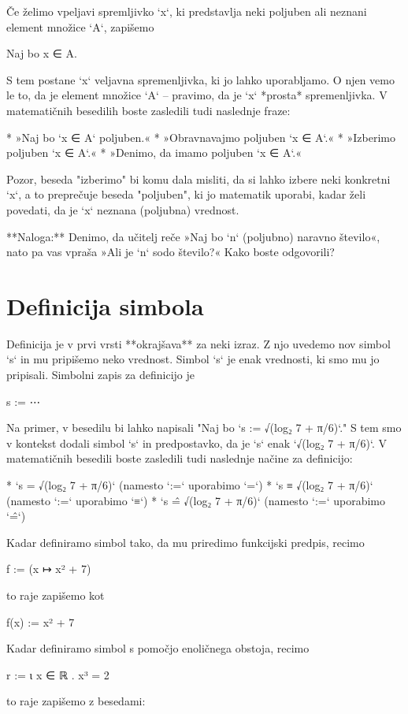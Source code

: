 Če želimo vpeljavi spremljivko `x`, ki predstavlja neki poljuben ali neznani element množice `A`, zapišemo

    Naj bo x ∈ A.

S tem postane `x` veljavna spremenljivka, ki jo lahko uporabljamo. O njen vemo le to, da je element množice `A` – pravimo, da je `x` *prosta* spremenljivka. V matematičnih besedilih boste zasledili tudi naslednje fraze:

* »Naj bo `x ∈ A` poljuben.«
* »Obravnavajmo poljuben `x ∈ A`.«
* »Izberimo poljuben `x ∈ A`.«
* »Denimo, da imamo poljuben `x ∈ A`.«

Pozor, beseda "izberimo" bi komu dala misliti, da si lahko izbere neki konkretni `x`, a to preprečuje beseda "poljuben", ki jo matematik uporabi, kadar želi povedati, da je `x` neznana (poljubna) vrednost.

**Naloga:** Denimo, da učitelj reče »Naj bo `n` (poljubno) naravno število«, nato pa vas vpraša »Ali je `n` sodo število?« Kako boste odgovorili?


\section{Definicija simbola}

Definicija je v prvi vrsti **okrajšava** za neki izraz. Z njo uvedemo nov simbol `s` in mu pripišemo neko vrednost.
Simbol `s` je enak vrednosti, ki smo mu jo pripisali. Simbolni zapis za definicijo je

    s := ⋯

Na primer, v besedilu bi lahko napisali "Naj bo `s := √(log₂ 7 + π/6)`." S tem smo v kontekst dodali simbol `s` in
predpostavko, da je `s` enak `√(log₂ 7 + π/6)`. V matematičnih besedili boste zasledili tudi naslednje načine za definicijo:

* `s = √(log₂ 7 + π/6)` (namesto `:=` uporabimo `=`)
* `s ≡ √(log₂ 7 + π/6)` (namesto `:=` uporabimo `≡`)
* `s =̂ √(log₂ 7 + π/6)` (namesto `:=` uporabimo `=̂`)

Kadar definiramo simbol tako, da mu priredimo funkcijski predpis, recimo

    f := (x ↦ x² + 7)

to raje zapišemo kot

    f(x) := x² + 7

Kadar definiramo simbol s pomočjo enoličnega obstoja, recimo

    r := ι x ∈ ℝ . x³ = 2

to raje zapišemo z besedami:

